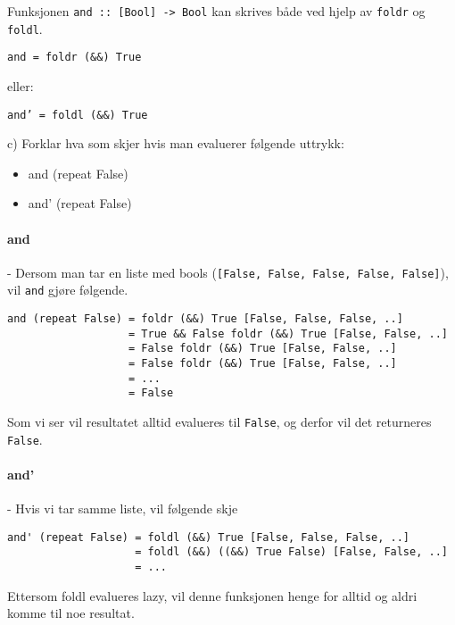 \documentclass{article}
\begin{document}
    Funksjonen \texttt{and :: [Bool] -> Bool} kan skrives både ved hjelp av \texttt{foldr} og \texttt{foldl}.

    \texttt{and = foldr (\&\&) True}
    
    eller:

    \texttt{and' = foldl (\&\&) True}

    c) Forklar hva som skjer hvis man evaluerer følgende uttrykk:

    \begin{itemize}
        \item and (repeat False)
        \item and' (repeat False)
    \end{itemize}

    \paragraph{and} - Dersom man tar en liste med bools (\texttt{[False, False, False, False, False]}), vil \texttt{and} gjøre følgende.

    \begin{lstlisting}
and (repeat False) = foldr (&&) True [False, False, False, ..]
                   = True && False foldr (&&) True [False, False, ..]
                   = False foldr (&&) True [False, False, ..]
                   = False foldr (&&) True [False, False, ..]
                   = ...
                   = False
    \end{lstlisting}

    Som vi ser vil resultatet alltid evalueres til \texttt{False}, og derfor vil det returneres \texttt{False}.

    \paragraph{and'} - Hvis vi tar samme liste, vil følgende skje

    \begin{lstlisting}
and' (repeat False) = foldl (&&) True [False, False, False, ..]
                    = foldl (&&) ((&&) True False) [False, False, ..]
                    = ...
    \end{lstlisting}

    Ettersom foldl evalueres lazy, vil denne funksjonen henge for alltid og aldri komme til noe resultat.
\end{document}
